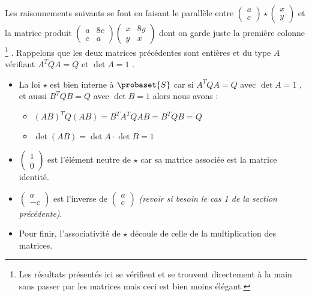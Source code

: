 Les raisonnements suivants se font en faisant le parallèle entre 
$\begin{pmatrix} 
  a \\ 
  c 
\end{pmatrix}
\star
\begin{pmatrix} 
  x \\ 
  y 
\end{pmatrix}$
et la matrice produit
$\begin{pmatrix} 
  a & 8c \\ 
  c & a 
\end{pmatrix}
\begin{pmatrix} 
  x & 8y \\ 
  y & x 
\end{pmatrix}$
dont on garde juste la première colonne
\footnote{
	Les résultats présentés ici se vérifient et se trouvent directement à la main sans passer par les matrices mais ceci est bien moins élégant.
} .
Rappelons que les deux matrices précédentes sont entières et du type $A$ vérifiant $A^T Q A = Q$ et $\det A = 1$ .


\begin{itemize}[label=\small\textbullet]
	\item La loi $\star$ est bien interne à $\probaset{S}$ car si $A^T Q A = Q$ avec $\det A = 1$ , et aussi $B^T Q B = Q$ avec $\det B = 1$ alors nous avons :
	
	\begin{itemize}[label=\raisebox{.3ex}{$\centerdot$}]
		\item $(AB)^T Q (AB) = B^T A^T Q A B = B^T Q B = Q$
		
		\medskip
		\item $\det(AB) = \det A \cdot \det B = 1$
	\end{itemize}


	\medskip
	\item
	$\begin{pmatrix} 
	  1 \\ 
	  0 
	\end{pmatrix}$
	est l'élément neutre de $\star$ car sa matrice associée est la matrice identité.


	\medskip
	\item
	$\begin{pmatrix} 
	  a  \\ 
	  -c 
	\end{pmatrix}$
	est l'inverse de
	$\begin{pmatrix} 
	  a \\ 
	  c 
	\end{pmatrix}$
	\textit{(revoir si besoin le cas 1 de la section précédente)}.


	\medskip
	\item Pour finir, l'associativité de $\star$ découle de celle de la multiplication des matrices.
\end{itemize}
